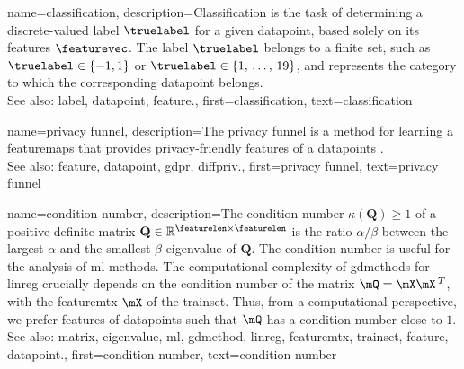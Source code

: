 {name={classification},
	description={Classification is the task of determining a 
 		discrete-valued \gls{label} $\truelabel$ for a given \gls{datapoint}, based solely on its 
 		\glspl{feature} $\featurevec$. The \gls{label} $\truelabel$ belongs to a finite set, such as 
 		$\truelabel \in \{-1,1\}$ or $\truelabel \in \{1, \,\ldots, \,19\}$, and represents the 
 		category to which the corresponding \gls{datapoint} belongs.
				\\ 
		See also: \gls{label}, \gls{datapoint}, \gls{feature}.},
	first={classification},
	text={classification} 
}


{name={privacy funnel},
	description={The privacy funnel is a method for learning 
	a \glspl{featuremap} that provides privacy-friendly \glspl{feature} of a 
	\glspl{datapoint} \cite{PrivacyFunnel}.
				\\ 
		See also: \gls{feature}, \gls{datapoint}, \gls{gdpr}, \gls{diffpriv}.},
 	first={privacy funnel},
	text={privacy funnel} 
}


{name={condition number},
	description={The condition number $\kappa(\mathbf{Q}) \geq 1$ of a 
		positive definite \gls{matrix} $\mathbf{Q} \in \mathbb{R}^{\featurelen \times \featurelen}$ is the ratio 
		$\alpha /\beta  $ between the largest $\alpha$ and the smallest $\beta$ \gls{eigenvalue} of 
		$\mathbf{Q}$. The condition number is useful for the analysis of \gls{ml} methods. 
		The computational complexity of \glspl{gdmethod} for \gls{linreg} crucially depends on the 
		condition number of the \gls{matrix} $\mQ = \mX \mX\,^{T}$, with the \gls{featuremtx} $\mX$ 
		of the \gls{trainset}. Thus, from a computational perspective, we prefer \glspl{feature} of 
		\glspl{datapoint} such that $\mQ$ has a condition number close to $1$.
					\\ 
		See also: \gls{matrix}, \gls{eigenvalue}, \gls{ml}, \gls{gdmethod}, \gls{linreg}, \gls{featuremtx}, \gls{trainset}, \gls{feature}, \gls{datapoint}.},
	first={condition number},
	text={condition number} 
}

